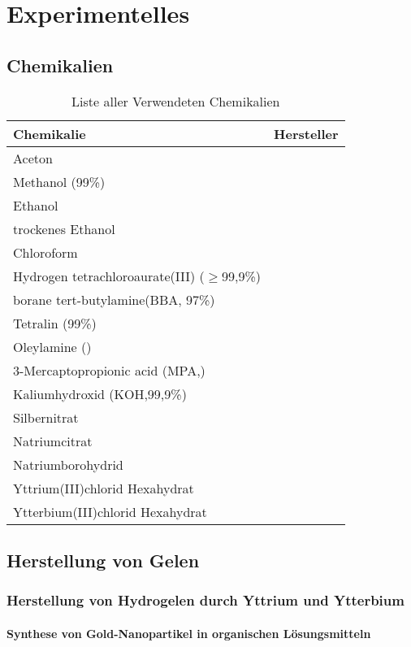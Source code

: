 \section{Experimentelles}
	\subsection{Chemikalien}
		\begin{table}[H]
			\centering
			\caption{Liste aller Verwendeten Chemikalien}
			\label{tab:Chemikalien}
			\begin{tabular}{ll}
				\toprule
				Chemikalie & Hersteller \\
				\midrule
				Aceton&\\
				Methanol (99\%)&\\
				Ethanol&\\
				trockenes Ethanol&\\
				Chloroform&\\
				Hydrogen tetrachloroaurate(III) ($\geq$99,9\%) & \\ 
				borane tert-butylamine(BBA, 97\%) &\\
				Tetralin (99\%)&\\
				Oleylamine ()&\\
				3-Mercaptopropionic acid (MPA,)&\\
				Kaliumhydroxid (KOH,99,9\%)&\\
				Silbernitrat&\\
				Natriumcitrat&\\
				Natriumborohydrid&\\
				Yttrium(III)chlorid Hexahydrat&\\
				Ytterbium(III)chlorid Hexahydrat&\\
				\bottomrule
			\end{tabular}
		\end{table}
	\subsection{Herstellung von Gelen}
		\subsubsection{Herstellung von Hydrogelen durch Yttrium und Ytterbium}
		
		
			\paragraph{Synthese von Gold-Nanopartikel in organischen Lösungsmitteln}
		
